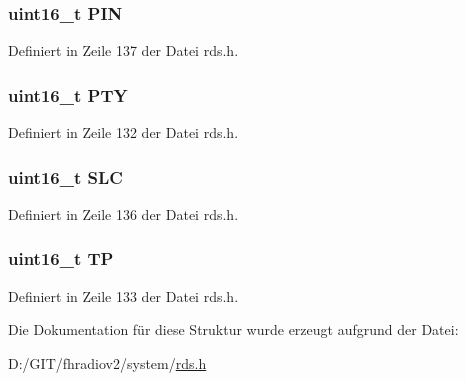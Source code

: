 \subsubsection[{P\+I\+N}]{\setlength{\rightskip}{0pt plus 5cm}uint16\+\_\+t P\+I\+N}\label{structgroup__1a_a23b9db30b873d9b45f435df66328a784}


Definiert in Zeile 137 der Datei rds.\+h.

\hypertarget{structgroup__1a_a0474967478fbbc2c71b800d2e0132d45}{}
\subsubsection[{P\+T\+Y}]{\setlength{\rightskip}{0pt plus 5cm}uint16\+\_\+t P\+T\+Y}\label{structgroup__1a_a0474967478fbbc2c71b800d2e0132d45}


Definiert in Zeile 132 der Datei rds.\+h.

\hypertarget{structgroup__1a_adeb94d897f554bdd08433c17155c53d2}{}
\subsubsection[{S\+L\+C}]{\setlength{\rightskip}{0pt plus 5cm}uint16\+\_\+t S\+L\+C}\label{structgroup__1a_adeb94d897f554bdd08433c17155c53d2}


Definiert in Zeile 136 der Datei rds.\+h.

\hypertarget{structgroup__1a_ab9e634c63b0d95a96716d5f6d7f06d72}{}
\subsubsection[{T\+P}]{\setlength{\rightskip}{0pt plus 5cm}uint16\+\_\+t T\+P}\label{structgroup__1a_ab9e634c63b0d95a96716d5f6d7f06d72}


Definiert in Zeile 133 der Datei rds.\+h.



Die Dokumentation für diese Struktur wurde erzeugt aufgrund der Datei\+:\begin{DoxyCompactItemize}
\item 
D\+:/\+G\+I\+T/fhradiov2/system/\hyperlink{rds_8h}{rds.\+h}\end{DoxyCompactItemize}
